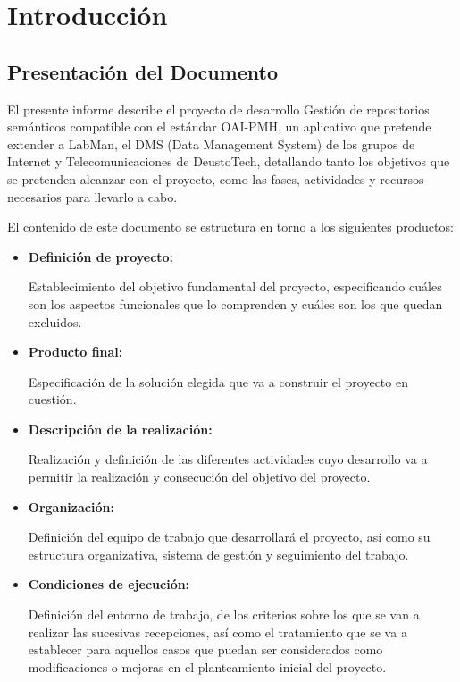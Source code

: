 \chapter{Introducción}

\section{Presentación del Documento}

El presente informe describe el proyecto de desarrollo Gestión de repositorios semánticos compatible con el estándar OAI-PMH, un aplicativo que pretende extender a LabMan, el DMS (Data Management System) de los grupos de Internet y Telecomunicaciones de DeustoTech, detallando tanto los objetivos que se pretenden alcanzar con el proyecto, como las fases, actividades y recursos necesarios para llevarlo a cabo.

El contenido de este documento se estructura en torno a los siguientes productos:

\begin{itemize}
	\item \textbf{Definición de proyecto:}
		
	Establecimiento del objetivo fundamental del proyecto, especificando cuáles son los aspectos funcionales que lo comprenden y cuáles son los que quedan excluidos.
	
	\item \textbf{Producto final:}
		
	Especificación de la solución elegida que va a construir el proyecto en cuestión.
	
	\item \textbf{Descripción de la realización:}

	Realización y definición de las diferentes actividades cuyo desarrollo va a permitir la realización y consecución del objetivo del proyecto.

	\item \textbf{Organización:}
	
	Definición del equipo de trabajo que desarrollará el proyecto, así como su estructura organizativa, sistema de gestión y seguimiento del trabajo.

	\item \textbf{Condiciones de ejecución:}

	Definición del entorno de trabajo, de los criterios sobre los que se van a realizar las sucesivas recepciones, así como el tratamiento que se va a establecer para aquellos casos que puedan ser considerados como modificaciones o mejoras en el planteamiento inicial del proyecto.
\end{itemize}

